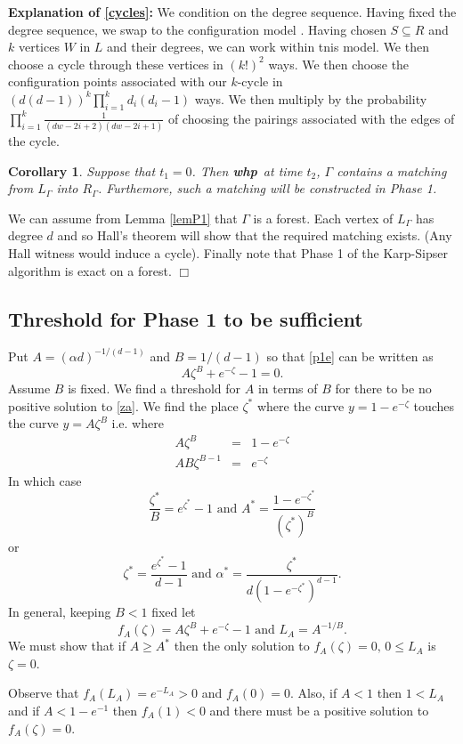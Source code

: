 \documentclass[11pt]{article}
\newenvironment{proof}{{\bf Proof:}}{\hfill\mbox{$\Box$}}
\def\a{\alpha}
\def\G{\Gamma}
\def\z{\zeta}
\def\whp{{\bf whp}}
\newtheorem{corollary}[theorem]{Corollary}
\newcommand{\beq}[1]{\begin{equation}\label{#1}}
\newcommand{\eeq}{\end{equation}}
\begin{document}
{\bf Explanation of \eqref{cycles}:} We condition on the degree sequence. 
Having fixed the degree sequence,
we swap to the configuration model \cite{BoCo}. Having chosen $S\subseteq R$ and $k$ vertices $W$ in $L$ and their
degrees, we can work within tnis model. We then choose a cycle through these vertices in $(k!)^2$ ways.
We then choose the configuration points associated with our $k$-cycle in 
$(d(d-1))^k\prod_{i=1}^kd_i(d_i-1)$ ways. We then multiply by the probability $\prod_{i=1}^k\frac{1}{(dw-2i+2)(dw-2i+1)}$
of choosing the pairings associated with the edges of the cycle.
\begin{corollary}\label{cor1}
Suppose that $t_1=0$. Then \whp\ at time $t_2$, $\G$ contains a matching from $L_\G$ into $R_\G$.
Furthemore, such a matching will be constructed in Phase 1.
\end{corollary}
\begin{proof}
We can assume from Lemma \ref{lemP1} that $\G$ is a forest. Each vertex of $L_\G$ has degree
$d$ and so Hall's theorem will show that the required matching exists. (Any Hall witness would induce a cycle).
Finally note that Phase 1 of the Karp-Sipser algorithm is exact on a forest.
\end{proof}
\subsection{Threshold for Phase 1 to be sufficient}
Put $A=(\a d)^{-1/(d-1)}$ and $B=1/(d-1)$ so that \eqref{p1e} can be written as
\beq{za}
A\z^B + e^{-\z}-1=0.
\eeq
Assume $B$ is fixed. We find a threshold for $A$ in terms of $B$ for there to be no positive solution to \eqref{za}. 
We find the place $\z^*$ where the curve
$y=1-e^{-\z}$ touches the curve $y=A\z^B$ i.e. where
\begin{eqnarray*}
A\z^B&=&1-e^{-\z}\\
AB\z^{B-1}&=&e^{-\z}
\end{eqnarray*}
In which case
\beq{mm0}
\frac{\z^*}{B}=e^{\z^*}-1\text{ and }A^*=\frac{1-e^{-\z^*}}{(\z^*)^B}
\eeq
or
\beq{zaaz}
\z^*=\frac{e^{\z^*}-1}{d-1}\text{ and }\a^*=\frac{\z^*}{d(1-e^{-\z^*})^{d-1}}.
\eeq
In general, keeping $B<1$ fixed let 
$$f_A(\z)=A\z^B+e^{-\z}-1\text{ and }L_A=A^{-1/B}.$$
We must show that if $A\geq A^*$ then the only solution to $f_A(\z)=0,\,0\leq L_A$ is $\z=0$.

Observe that $f_A(L_A)=e^{-L_A}>0$ and $f_A(0)=0$. Also, if $A<1$ then $1<L_A$ and if $A<1-e^{-1}$ then $f_A(1)<0$
and there must be a positive solution to $f_A(\z)=0$.
\end{document}
